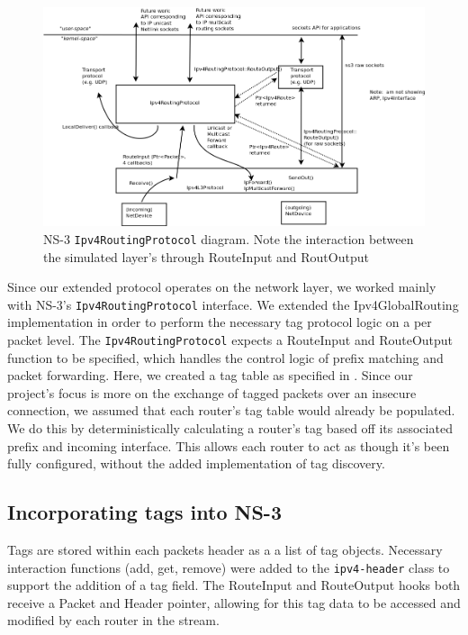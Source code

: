 \documentclass[12pt]{article} %
\newcommand{\prettycode}[1]
{\lstinline[basicstyle=\ttfamily]{#1}}
\begin{document}
\begin{figure}[ht!]
\includegraphics[width=160mm]{routing.png}
\caption{NS-3 \prettycode{Ipv4RoutingProtocol} diagram. Note the interaction between the simulated layer's through RouteInput and RoutOutput\cite{ns-3-routing}}
\end{figure}

Since our extended protocol operates on the network layer, we worked mainly with NS-3's \prettycode{Ipv4RoutingProtocol} interface. We extended the Ipv4GlobalRouting implementation in order to perform the necessary tag protocol logic on a per packet level. The \prettycode{Ipv4RoutingProtocol} expects a RouteInput and RouteOutput function to be specified, which handles the control logic of prefix matching and packet forwarding. Here, we created a tag table as specified in \cite{Shue20081567}. Since our project's focus is more on the exchange of tagged packets over an insecure connection, we assumed that each router's tag table would already be populated. We do this by deterministically calculating a router's tag based off its associated prefix and incoming interface. This allows each router to act as though it's been fully configured, without the added implementation of tag discovery. 

\subsection{Incorporating tags into NS-3}

Tags are stored within each packets header as a a list of tag objects. Necessary interaction functions (add, get, remove) were added to the \prettycode{ipv4-header} class to support the addition of a tag field. The RouteInput and RouteOutput hooks both receive a Packet and Header pointer, allowing for this tag data to be accessed and modified by each router in the stream. 
\end{document}
